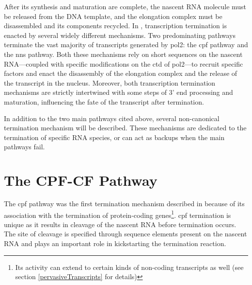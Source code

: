  \label{termination}
After its synthesis and maturation are complete, the nascent RNA molecule must be released from the DNA template, and the elongation complex must be disassembled and its components recycled.
In \cer{}, transcription termination is enacted by several widely different mechanisms.
Two predominating pathways terminate the vast majority of transcripts generated by \acrlong{pol2}: the \gls{cpf} pathway and the \gls{nns}  pathway. 
Both these mechanisms rely on short sequences on the nascent RNA---coupled with specific modifications on the \gls{ctd} of \gls{pol2}---to recruit specific factors and enact the disassembly of the elongation complex and the release of the transcript in the nucleus.
Moreover, both transcription termination mechanisms are strictly intertwined with some steps of 3' end processing and maturation, influencing the fate of the transcript after termination. 

In addition to the two main pathways cited above, several non-canonical termination mechanism will be described.
These mechanisms are dedicated to the termination of specific RNA species, or can act as backups when the main pathways fail.






\section{The CPF-CF Pathway}
The \gls{cpf} pathway was the first termination mechanism described in \cer{} because of its association with the termination of protein-coding genes\footnote{Its activity can extend to certain kinds of non-coding transcripts as well (see section \ref{pervasiveTranscripts} for details)}. 
\gls{cpf} termination is unique as it results in cleavage of the nascent RNA before termination occurs.
The site of cleavage is specified through sequence elements present on the nascent RNA and plays an important role in kickstarting the termination reaction.

